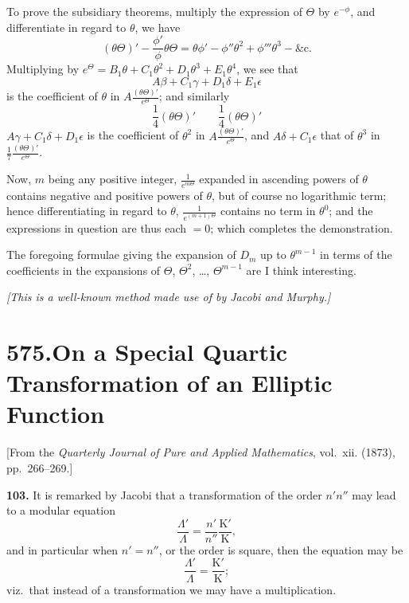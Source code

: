\documentclass[11pt,a4paper]{article}
\theoremstyle{plain}
\begin{document}
To prove the subsidiary theorems, multiply the expression of $\Theta$ by $e^{-\phi}$, and differentiate in regard to $\theta$, we have
\[
(\theta\Theta)' - \frac{\phi'}{\phi}\theta\Theta = \theta\phi' - \phi''\theta^2 + \phi'''\theta^3 - \&\text{c.}
\]
Multiplying by $e^{\Theta} = B_1\theta + C_1\theta^2 + D_1\theta^3 + E_1\theta^4$, we see that
\[
A\beta + C_1\gamma + D_1\delta + E_1\epsilon
\]
is the coefficient of $\theta$ in $A\frac{(\theta\Theta)'}{e^{\Theta}}$; and similarly
\[
\frac{1}{4}(\theta\Theta)' \qquad \frac{1}{4}(\theta\Theta)'
\]
$A\gamma + C_1\delta + D_1\epsilon$ is the coefficient of $\theta^2$ in $A\frac{(\theta\Theta)'}{e^{\Theta}}$, and $A\delta + C_1\epsilon$ that of $\theta^3$ in $\frac{1}{7}\frac{(\theta\Theta)'}{e^{\Theta}}$.

Now, $m$ being any positive integer, $\frac{1}{e^{m\Theta}}$ expanded in ascending powers of $\theta$ contains negative and positive powers of $\theta$, but of course no logarithmic term; hence differentiating in regard to $\theta$, $\frac{1}{e^{(m+1)\Theta}}$ contains no term in $\theta^0$; and the expressions in question are thus each $= 0$; which completes the demonstration.

The foregoing formulae giving the expansion of $D_m$ up to $\theta^{m-1}$ in terms of the coefficients in the expansions of $\Theta$, $\Theta^2$, \dots, $\Theta^{m-1}$ are I think interesting.

\smallskip
\textit{[This is a well-known method made use of by Jacobi and Murphy.]}


\newpage
\section*{575.\quad On a Special Quartic Transformation of an Elliptic Function}

\begin{flushright}
\small[From the \textit{Quarterly Journal of Pure and Applied Mathematics}, vol.~xii. (1873), pp.~266--269.]
\end{flushright}

\noindent\textbf{103.} It is remarked by Jacobi that a transformation of the order $n'n''$ may lead to a modular equation
\[
\frac{\Lambda'}{\Lambda} = \frac{n'}{n''}\frac{\mathrm{K}'}{\mathrm{K}},
\]
and in particular when $n' = n''$, or the order is square, then the equation may be
\[
\frac{\Lambda'}{\Lambda} = \frac{\mathrm{K}'}{\mathrm{K}};
\]
viz.\ that instead of a transformation we may have a multiplication.
\end{document}
